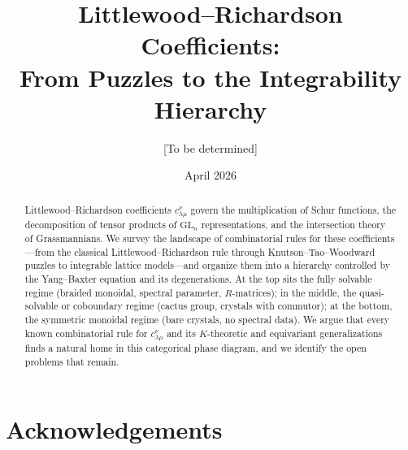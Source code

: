 \documentclass[11pt,a4paper]{article}
\title{Littlewood--Richardson Coefficients:\\
  From Puzzles to the Integrability Hierarchy}
\author{[To be determined]}
\date{April 2026}
\theoremstyle{plain}
\theoremstyle{definition}
\theoremstyle{remark}
\newcommand{\GL}{\mathrm{GL}}
\begin{document}
\maketitle

\begin{abstract}
%
%
Littlewood--Richardson coefficients $c_{\lambda\mu}^{\nu}$ govern the
multiplication of Schur functions, the decomposition of tensor products
of $\GL_n$ representations, and the intersection theory of Grassmannians.
We survey the landscape of combinatorial rules for these coefficients---from
the classical Littlewood--Richardson rule through Knutson--Tao--Woodward
puzzles to integrable lattice models---and organize them into a hierarchy
controlled by the Yang--Baxter equation and its degenerations.
At the top sits the fully solvable regime (braided monoidal, spectral parameter,
$R$-matrices); in the middle, the quasi-solvable or coboundary regime
(cactus group, crystals with commutor); at the bottom, the symmetric
monoidal regime (bare crystals, no spectral data). We argue that every
known combinatorial rule for $c_{\lambda\mu}^{\nu}$ and its
$K$-theoretic and equivariant generalizations finds a natural home in
this categorical phase diagram, and we identify the open problems that
remain.
\end{abstract}

\tableofcontents

\bigskip









\section*{Acknowledgements}
\end{document}
